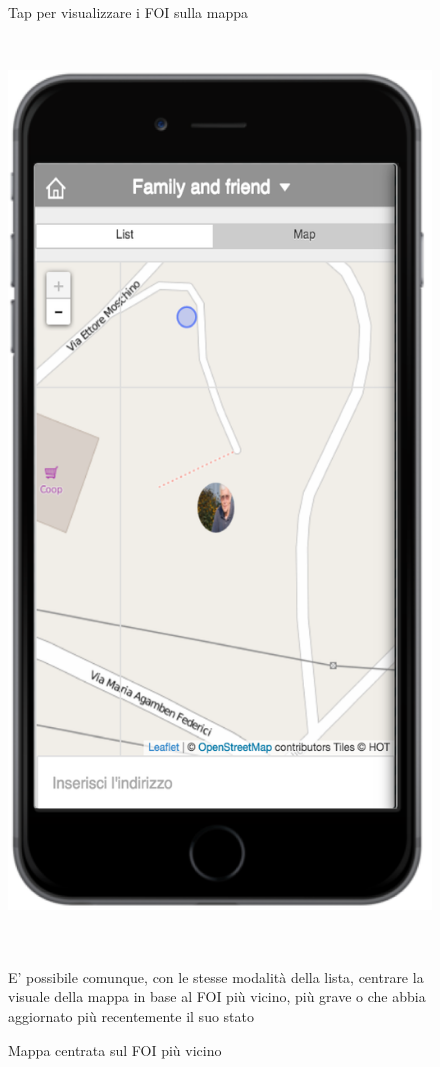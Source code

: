 \begin{figure}
\begin{minipage}[b]{6cm}
	\caption{Tap per visualizzare i FOI sulla mappa }
	\label{fig:mapfoi}
 \end{minipage}
 \ \hspace{6 mm} \hspace{7 mm} \
 \begin{minipage}[b]{6cm}
\centering
	\includegraphics[scale=0.6]{interfaccia/mappafoi.png}
	\caption{Mappa centrata sul FOI più vicino }
	\label{fig:mappafoi}
 \end{minipage}
 \\ \\
E' possibile comunque, con le stesse modalità della lista, centrare la visuale della mappa in base al FOI più vicino, più grave o che abbia aggiornato più recentemente il suo stato
\end{figure}



